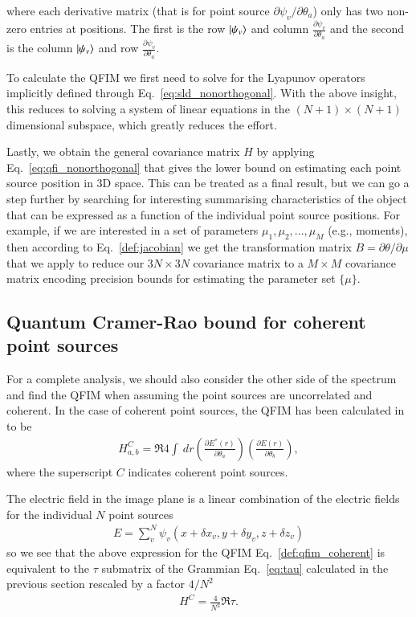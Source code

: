 \documentclass[reprint,amsmath,amssymb,aps,pra,floatfix]{revtex4-2}
\begin{document}
where each derivative matrix (that is for point source $\partial \psi_v / \partial \theta_a$) only has two non-zero entries at positions. The first is the row $\ket{\psi_v}$ and column $\frac{\partial \psi_v}{\partial \theta_a}$ and the second is the column $\ket{\psi_v}$ and row $\frac{\partial \psi_v}{\partial \theta_a}$.

To calculate the QFIM we first need to solve for the Lyapunov operators implicitly defined through Eq.~\eqref{eq:sld_nonorthogonal}. With the above insight, this reduces to solving a system of linear equations in the $(N+1) \times (N+1)$ dimensional subspace, which greatly reduces the effort.

Lastly, we obtain the general covariance matrix $H$ by applying Eq.~\eqref{eq:qfi_nonorthogonal} that gives the lower bound on estimating each point source position in 3D space. This can be treated as a final result, but we can go a step further by searching for interesting summarising characteristics of the object that can be expressed as a function of the individual point source positions. For example, if we are interested in a set of parameters $\mu_1, \mu_2, ..., \mu_M$ (e.g., moments), then according to Eq.~\eqref{def:jacobian} we get the transformation matrix $B=\partial \theta / \partial \mu$ that we apply to reduce our $3N \times 3N$ covariance matrix to a $M \times M$ covariance matrix encoding precision bounds for estimating the parameter set $\{\mu\}$.



\subsection{\label{subsec:QFI_coherent} Quantum Cramer-Rao bound for coherent point sources}
For a complete analysis, we should also consider the other side of the spectrum and find the QFIM when assuming the point sources are uncorrelated and coherent. In the case of coherent point sources, the QFIM has been calculated in \cite{da2021super} to be
\begin{align}
    H^C_{a,b} = \Re{4 \int \ dr \left( \frac{\partial E^*(r)}{\partial \theta_a} \right)  \left( \frac{\partial E(r)}{\partial \theta_b} \right)},
    \label{def:qfim_coherent}
\end{align}
where the superscript $C$ indicates coherent point sources.

The electric field in the image plane is a linear combination of the electric fields for the individual $N$ point sources
\begin{align}
    E = \sum_v^N \psi_v (x+\delta x_v, y+\delta y_v, z+\delta z_v)
\end{align}
so we see that the above expression for the QFIM Eq.~\eqref{def:qfim_coherent} is equivalent to the $\tau$ submatrix of the Grammian Eq.~\eqref{eq:tau} calculated in the previous section rescaled by a factor $4/N^2$
\begin{align}
    H^C = \frac{4}{N^2} \Re \tau.
\end{align}
\end{document}
